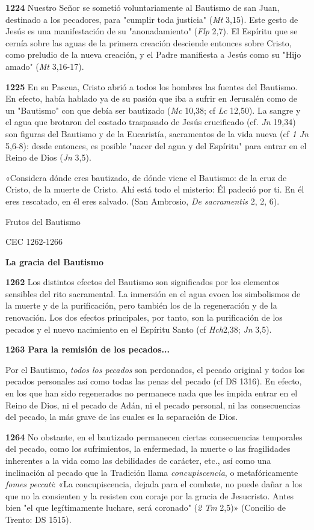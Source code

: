 \documentclass[]{article}
\begin{document}
\textbf{1224} Nuestro Señor se sometió voluntariamente al Bautismo de
san Juan, destinado a los pecadores, para "cumplir toda justicia"
(\emph{Mt} 3,15). Este gesto de Jesús es una manifestación de su
"anonadamiento" (\emph{Flp} 2,7). El Espíritu que se cernía sobre las
aguas de la primera creación desciende entonces sobre Cristo, como
preludio de la nueva creación, y el Padre manifiesta a Jesús como su
"Hijo amado" (\emph{Mt} 3,16-17).

\textbf{1225} En su Pascua, Cristo abrió a todos los hombres las fuentes
del Bautismo. En efecto, había hablado ya de su pasión que iba a sufrir
en Jerusalén como de un "Bautismo" con que debía ser bautizado
(\emph{Mc} 10,38; cf \emph{Lc} 12,50). La sangre y el agua que brotaron
del costado traspasado de Jesús crucificado (cf. \emph{Jn} 19,34) son
figuras del Bautismo y de la Eucaristía, sacramentos de la vida nueva
(cf \emph{1 Jn} 5,6-8): desde entonces, es posible "nacer del agua y del
Espíritu" para entrar en el Reino de Dios (\emph{Jn} 3,5).

«Considera dónde eres bautizado, de dónde viene el Bautismo: de la cruz
de Cristo, de la muerte de Cristo. Ahí está todo el misterio: Él padeció
por ti. En él eres rescatado, en él eres salvado. (San Ambrosio,
\emph{De sacramentis} 2, 2, 6).

Frutos del Bautismo

CEC 1262-1266

\textbf{La gracia del Bautismo}

\textbf{1262} Los distintos efectos del Bautismo son significados por
los elementos sensibles del rito sacramental. La inmersión en el agua
evoca los simbolismos de la muerte y de la purificación, pero también
los de la regeneración y de la renovación. Los dos efectos principales,
por tanto, son la purificación de los pecados y el nuevo nacimiento en
el Espíritu Santo (cf \emph{Hch}2,38; \emph{Jn} 3,5).

\textbf{1263 Para la remisión de los pecados...}

Por el Bautismo, \emph{todos los pecados} son perdonados, el pecado
original y todos los pecados personales así como todas las penas del
pecado (cf DS 1316). En efecto, en los que han sido regenerados no
permanece nada que les impida entrar en el Reino de Dios, ni el pecado
de Adán, ni el pecado personal, ni las consecuencias del pecado, la más
grave de las cuales es la separación de Dios.

\textbf{1264} No obstante, en el bautizado permanecen ciertas
consecuencias temporales del pecado, como los sufrimientos, la
enfermedad, la muerte o las fragilidades inherentes a la vida como las
debilidades de carácter, etc., así como una inclinación al pecado que la
Tradición llama \emph{concupiscencia}, o metafóricamente \emph{fomes
peccati}: «La concupiscencia, dejada para el combate, no puede dañar a
los que no la consienten y la resisten con coraje por la gracia de
Jesucristo. Antes bien "el que legítimamente luchare, será coronado"
(\emph{2 Tm} 2,5)» (Concilio de Trento: DS 1515).
\end{document}
